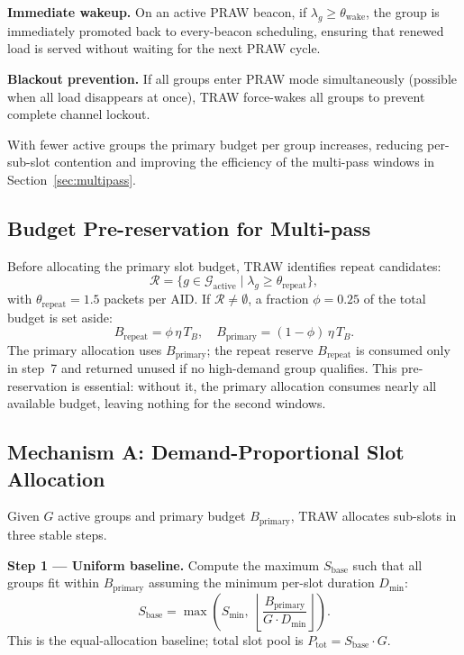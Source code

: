 \documentclass[conference]{IEEEtran}
\begin{document}
\textbf{Immediate wakeup.}
On an active PRAW beacon, if $\lambda_g\!\geq\!\theta_\mathrm{wake}$,
the group is immediately promoted back to every-beacon scheduling,
ensuring that renewed load is served without waiting for the next PRAW
cycle.

\textbf{Blackout prevention.}
If all groups enter PRAW mode simultaneously (possible when all load
disappears at once), TRAW force-wakes all groups to prevent complete
channel lockout.

With fewer active groups the primary budget per group increases,
reducing per-sub-slot contention and improving the efficiency of
the multi-pass windows in Section~\ref{sec:multipass}.

\subsection{Budget Pre-reservation for Multi-pass}
\label{sec:prereserve}

Before allocating the primary slot budget, TRAW identifies repeat
candidates:
\begin{equation}
  \mathcal{R} = \{g \in \mathcal{G}_\mathrm{active} \mid
    \lambda_g \geq \theta_\mathrm{repeat}\},
  \label{eq:repeat_cand}
\end{equation}
with $\theta_\mathrm{repeat}\!=\!1.5$ packets per AID.
If $\mathcal{R}\!\neq\!\emptyset$, a fraction $\phi\!=\!0.25$ of the
total budget is set aside:
\begin{equation}
  B_\mathrm{repeat} = \phi\,\eta\,T_B, \quad
  B_\mathrm{primary} = (1-\phi)\,\eta\,T_B.
  \label{eq:budget_split}
\end{equation}
The primary allocation uses $B_\mathrm{primary}$; the repeat reserve
$B_\mathrm{repeat}$ is consumed only in step~7 and returned unused if no
high-demand group qualifies.
This pre-reservation is essential: without it, the primary allocation
consumes nearly all available budget, leaving nothing for the second
windows.

\subsection{Mechanism A: Demand-Proportional Slot Allocation}
\label{sec:alloc}

Given $G$ active groups and primary budget $B_\mathrm{primary}$,
TRAW allocates sub-slots in three stable steps.

\textbf{Step 1 --- Uniform baseline.}
Compute the maximum $S_\mathrm{base}$ such that all groups fit within
$B_\mathrm{primary}$ assuming the minimum per-slot duration $D_\mathrm{min}$:
\begin{equation}
  S_\mathrm{base} = \max\!\left(S_\mathrm{min},\;
    \left\lfloor\frac{B_\mathrm{primary}}{G\cdot D_\mathrm{min}}\right\rfloor\right).
  \label{eq:base_slots}
\end{equation}
This is the equal-allocation baseline; total slot pool is
$P_\mathrm{tot}\!=\!S_\mathrm{base}\cdot G$.
\end{document}
